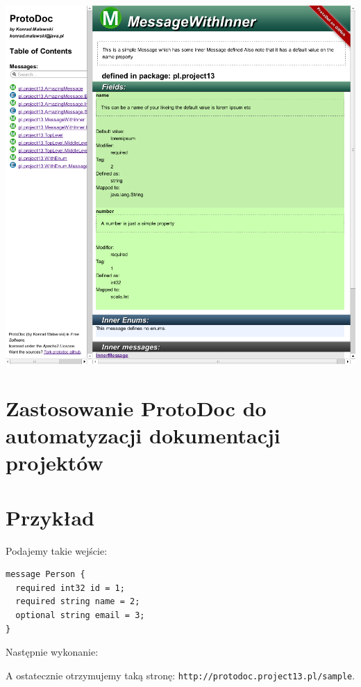 \begin{center}
 \includegraphics[width=\textwidth]{../protodoc_main.png}
\end{center}

\chapter{Zastosowanie ProtoDoc do automatyzacji dokumentacji projektów}

\chapter{Przykład}
Podajemy takie wejście:
\begin{verbatim}
message Person {
  required int32 id = 1;
  required string name = 2;
  optional string email = 3;
}
\end{verbatim}

Następnie wykonanie:

A ostatecznie otrzymujemy taką stronę: \verb|http://protodoc.project13.pl/sample|.

